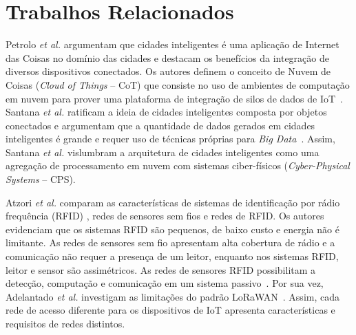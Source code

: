 \documentclass[12pt]{article}
\begin{document}
\section{Trabalhos Relacionados}
\label{sec:relacionados}

Petrolo {\it et al.} argumentam que cidades inteligentes é uma aplicação de Internet das Coisas no domínio das cidades e destacam os benefícios da integração de diversos dispositivos conectados. Os autores definem o conceito de Nuvem de Coisas ({\it Cloud of Things} – CoT) que consiste no uso de ambientes de computação em nuvem para prover uma plataforma de integração de silos de dados de IoT~\cite{petrolo}. Santana {\it et al.} ratificam a ideia de cidades inteligentes composta por objetos conectados e argumentam que a quantidade de dados gerados em cidades inteligentes é grande e requer uso de técnicas próprias para {\it Big Data}~\cite{interscity-paper}. Assim, Santana {\it et al.} vislumbram a arquitetura de cidades inteligentes como uma agregação de processamento em nuvem com sistemas ciber-físicos ({\it Cyber-Physical Systems} – CPS).


Atzori {\it et al.} comparam as características de sistemas de identificação por rádio frequência (RFID)
, redes de sensores sem fios e redes de RFID.  Os autores evidenciam que os sistemas RFID são pequenos, de baixo custo e energia não é limitante. As redes de sensores sem fio apresentam alta cobertura de rádio e a comunicação não requer a presença de um leitor,
enquanto nos sistemas RFID, leitor e sensor são assimétricos.
As redes de sensores RFID possibilitam a detecção, computação e comunicação em um sistema passivo~\cite{survey-morabrito}. Por sua vez, Adelantado {\it et al.} investigam as limitações do padrão LoRaWAN~\cite{lorawan}. Assim, cada rede de acesso diferente para os dispositivos de IoT apresenta características e requisitos de redes distintos. 
\end{document}

